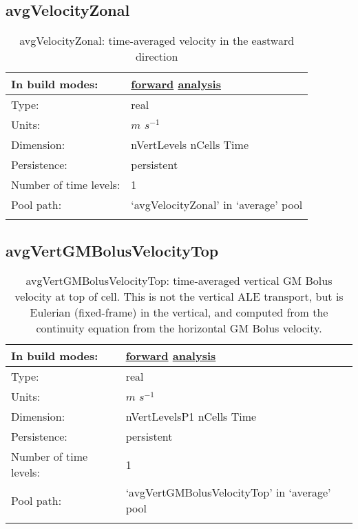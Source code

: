 \subsection[avgVelocityZonal]{avgVelocityZonal}
\label{subsec:var_sec_average_avgVelocityZonal}
\begin{center}
\begin{longtable}{| p{2.0in} | p{4.0in} |}
        \hline 
        In build modes: & \hyperref[subsec:forward_var_tab_average]{forward} \hyperref[subsec:analysis_var_tab_average]{analysis} \\
        \hline 
        Type: & real \\
        \hline 
        Units: & $m$ $s^{-1}$ \\
        \hline 
        Dimension: & nVertLevels nCells Time \\
        \hline 
        Persistence: & persistent \\
        \hline 
        Number of time levels: & 1 \\
        \hline 
            Pool path: & `avgVelocityZonal' in `average' pool \\
		 \hline 
    \caption{avgVelocityZonal: time-averaged velocity in the eastward direction}
\end{longtable}
\end{center}
\subsection[avgVertGMBolusVelocityTop]{avgVertGMBolusVelocityTop}
\label{subsec:var_sec_average_avgVertGMBolusVelocityTop}
\begin{center}
\begin{longtable}{| p{2.0in} | p{4.0in} |}
        \hline 
        In build modes: & \hyperref[subsec:forward_var_tab_average]{forward} \hyperref[subsec:analysis_var_tab_average]{analysis} \\
        \hline 
        Type: & real \\
        \hline 
        Units: & $m$ $s^{-1}$ \\
        \hline 
        Dimension: & nVertLevelsP1 nCells Time \\
        \hline 
        Persistence: & persistent \\
        \hline 
        Number of time levels: & 1 \\
        \hline 
            Pool path: & `avgVertGMBolusVelocityTop' in `average' pool \\
		 \hline 
    \caption{avgVertGMBolusVelocityTop: time-averaged vertical GM Bolus velocity at top of cell.  This is not the vertical ALE transport, but is Eulerian (fixed-frame) in the vertical, and computed from the continuity equation from the horizontal GM Bolus velocity.}
\end{longtable}
\end{center}
